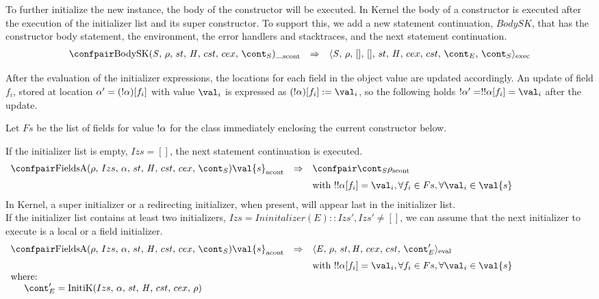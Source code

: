 \documentclass{article}
\begin{document}
\noindent
To further initialize the new instance, the body of the constructor will be executed.
In Kernel the body of a constructor is executed after the execution of the initializer list and its super constructor.
\noindent
To support this, we add a new statement continuation, $BodySK$, that has the constructor body statement, the environment, the error handlers and stacktraces, and the next statement continuation.
\[
  \begin{array}{lcl}
	\scontconf{\BodySK{\stmt}{\env}{\scont}}{\_}
	& \Rightarrow &
	\execconf{\stmt}{\env}{[]}{[]}{\handler}{\cex}{\cstrace}{\econt}{\scont}
  \end{array}
\]

\noindent
After the evaluation of the initializer expressions, the locations for each field in the object value are updated accordingly.
An update of field $f_i$, stored at location $\alpha' = (!\alpha)[f_i]$ with value $\val_i$ is expressed as $\update{(\deref{\loc})[f_i]}{\val_{i}}$, so the following holds $\deref{\loc'} = \deref{\deref{\loc[f_i]}} = \val_{i}$ after the update.

\noindent
Let $Fs$ be the list of fields for value $!\alpha$ for the class immediately enclosing the current constructor below.

If the initializer list is empty, $Izs = []$, the next statement continuation is executed.
\[
  \begin{array}{lcl@{\hspace{30mm}}}
	\acontconf{\FieldsA{\env}{Izs}{\loc}{\scont}}{\val{s}}
	& \Rightarrow &
	\scontconf{\scont}{\env}\\[2mm]
	&&\textrm{with }\deref{\deref\loc[f_i]} = \val_{i}, \forall f_i \in Fs, \forall \val_i \in \val{s}
  \end{array}
\]
\noindent
In Kernel, a super initializer or a redirecting initializer, when present, will appear last in the initializer list.\\
If the initializer list contains at least two initializers, $Izs = Ininitalizer(E) :: Izs', Izs' \neq []$, we can assume that the next initializer to execute is a local or a field initializer.
\[
  \begin{array}{lcl@{\hspace{30mm}}}
	\acontconf{\FieldsA{\env}{Izs}{\loc}{\scont}}{\val{s}}
	& \Rightarrow &
	\evalconf{\expr}{\env}{st}{cex}{cst}{\econt'}\\[2mm]
	&&\textrm{with }\deref{\deref{\loc[f_i]}} = \val_{i}, \forall f_i \in Fs, \forall \val_i \in \val{s}\\
	\textrm{where:}\\
	\hspace{5mm}\econt' = \InitK{Izs}{\loc}{\env}
  \end{array}
\]
\end{document}
